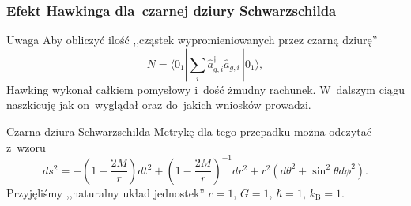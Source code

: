 \documentclass{beamer}  %
\begin{document}
\begin{frame}
  \frametitle{Efekt Hawkinga dla~czarnej dziury Schwarzschilda}

  \begin{block}{Uwaga}
    Aby obliczyć ilość ,,cząstek wypromieniowanych przez czarną
    dziurę''
    \begin{equation}
      \label{eq:HawkingPromieniowanie-13}
      N
      = \langle 0_{ 1 } | \sum_{ i } \widehat{ a }_{ g, i }^{ \dagger }
      \widehat{ a }_{ g, i }\, | 0_{ 1 } \rangle,
    \end{equation}
    Hawking wykonał całkiem pomysłowy i~dość żmudny rachunek.
    W~dalszym ciągu naszkicuję jak on~wyglądał oraz do~jakich wniosków
    prowadzi.
  \end{block}

  \begin{block}{Czarna dziura Schwarzschilda}
    Metrykę dla tego przepadku można odczytać z~wzoru
    \begin{equation}
      \label{eq:HawkingPromieniowanie-14}
      ds^{ 2 } = -\left(1 - \frac{ 2M }{ r } \right) dt^{ 2 }
      + \left(1 - \frac{ 2M }{ r } \right)^{ -1 } dr^{ 2 }
      + r^{ 2 } ( d \theta^{ 2 } + \sin^{ 2 }\theta d\phi^{ 2 } ).
    \end{equation}
    Przyjęliśmy ,,naturalny układ jednostek'' $c = 1$, $G = 1$,
    $\hbar = 1$, $k_{ \mathrm{B} } = 1$.
  \end{block}

\end{frame}
\end{document}
